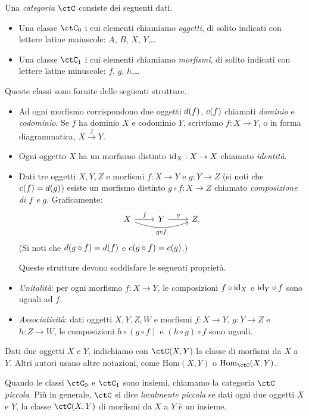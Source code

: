 \begin{definition}
 Una \emph{categoria} $\ctC$ consiste dei seguenti dati.
 \begin{itemize}
  \item Una classe $\ctC_0$ i cui elementi chiamiamo \emph{oggetti}, di solito indicati con lettere latine maiuscole: $A$, $B$, $X$, $Y$,\dots
  \item Una classe $\ctC_1$ i cui elementi chiamiamo \emph{morfismi}, di solito indicati con lettere latine minuscole: $f$, $g$, $h$,\dots
 \end{itemize}
 Queste classi sono fornite delle seguenti strutture. 
 \begin{itemize}  
  \item Ad ogni morfismo corrispondono due oggetti $d(f)$, $c(f)$ chiamati \emph{dominio} e \emph{codominio}. Se $f$ ha dominio $X$ e codominio $Y$, scriviamo $f:X\to Y$, o in forma diagrammatica, $X \xrightarrow{f} Y$.
  \item Ogni oggetto $X$ ha un morfismo distinto $\mathrm{id}_X:X\to X$ chiamato \emph{identità}.
  \item Dati tre oggetti $X,Y,Z$ e morfismi $f:X\to Y$ e $g:Y\to Z$ (si noti che $c(f)=d(g)$) esiste un morfismo distinto $g\circ f:X\to Z$ chiamato \emph{composizione di $f$ e $g$}. Graficamente:
  \[
  \begin{tikzcd}
   X \ar{r}{f} \ar[bend right=20]{rr}[swap]{g\circ f} & Y \ar{r}{g} & Z .
  \end{tikzcd}
  \]
  (Si noti che $d(g\circ f)=d(f)$ e $c(g\circ f)=c(g)$.)
  
  Queste strutture devono soddisfare le seguenti proprietà.
  
  \item \emph{Unitalità}: per ogni morfismo $f:X\to Y$, le composizioni $f\circ\mathrm{id}_X$ e $\mathrm{id}_Y\circ f$ sono uguali ad $f$.
  \item \emph{Associatività}: dati oggetti $X,Y,Z,W$ e morfismi $f:X\to Y$, $g:Y\to Z$ e $h:Z\to W$, le composizioni $h\circ (g\circ f)$ e $(h\circ g)\circ f$ sono uguali.
 \end{itemize}
\end{definition}

Dati due oggetti $X$ e $Y$, indichiamo con $\Hom{\ctC}(X,Y)$ la classe di morfismi da $X$ a $Y$. Altri autori usano altre notazioni, come $\mathrm{Hom}(X,Y)$ o $\mathrm{Hom}_\ctC(X,Y)$.


Quando le classi $\ctC_0$ e $\ctC_1$ sono insiemi, chiamamo la categoria $\ctC$ \emph{piccola}. Più in generale, $\ctC$ si dice \emph{localmente piccola} se dati ogni due oggetti $X$ e $Y$, la classe $\Hom{\ctC}(X,Y)$ di morfismi da $X$ a $Y$ è un insieme. 

